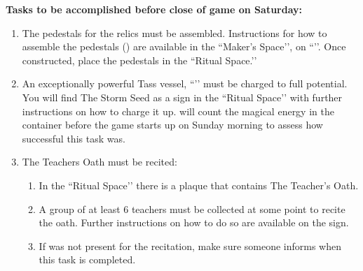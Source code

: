 \documentclass[green]{GL2020}
\begin{document}
\textbf{Tasks to be accomplished before close of game on Saturday:}
\begin{enumerate}
  \item The pedestals for the relics must be assembled. Instructions for how to assemble the pedestals (\iPedestalForRelic{}) are available in the ``Maker's Space’’, on ``\sSignF{}’’. Once constructed, place the pedestals in the ``Ritual Space.’’
  \item An exceptionally powerful Tass vessel, ``\sStormSeed{}’’ must be charged to full potential. You will find The Storm Seed as a sign in the ``Ritual Space’’ with further instructions on how to charge it up. \cPrincipal{} will count the magical energy in the container before the game starts up on Sunday morning to assess how successful this task was.
  \item The Teachers Oath must be recited:
  \begin{enumerate}
    \item In the ``Ritual Space’’ there is a plaque that contains The Teacher’s Oath.
    \item A group of at least 6 teachers must be collected at some point to recite the oath. Further instructions on how to do so are available on the sign.
    \item If \cPrincipal{} was not present for the recitation, make sure someone informs \cPrincipal{\them} when this task is completed.
  \end{enumerate}
\end{enumerate}
\end{document}
